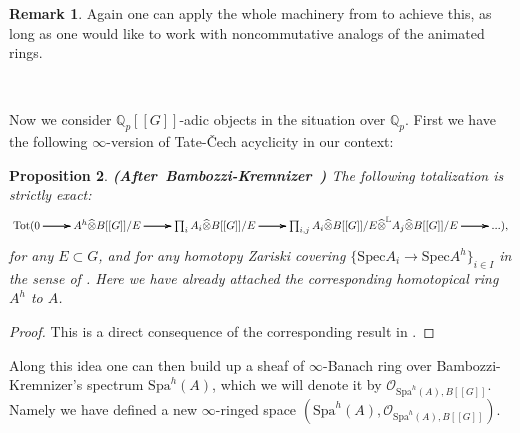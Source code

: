 \documentclass[12pt]{amsart}
\newtheorem{theorem}{Theorem}[section]
\newtheorem{proposition}[theorem]{Proposition}
\theoremstyle{definition}
\newtheorem{remark}[theorem]{Remark}
\numberwithin{equation}{section}
\begin{document}
\begin{remark}
Again one can apply the whole machinery from \cite{CS} to achieve this, as long as one would like to work with noncommutative analogs of the animated rings.	
\end{remark}






%


\

\indent Now we consider $\mathbb{Q}_p[[G]]$-adic objects in the situation over $\mathbb{Q}_p$. First we have the following $\infty$-version of Tate-\v{C}ech acyclicity in our context:


\begin{proposition}\mbox{\bf{(After Bambozzi-Kremnizer \cite[Theorem 4.15]{BK1})}} 
The following totalization is strictly exact:
\[
\xymatrix@C+0pc@R+0pc{
\mathrm{Tot}(0  \ar[r]\ar[r]\ar[r] &A^h\widehat{\otimes} B[[G]]/E \ar[r]\ar[r]\ar[r] & \prod_i A_i\widehat{\otimes} B[[G]]/E \ar[r]\ar[r]\ar[r] &\prod_{i,j} A_i\widehat{\otimes} B[[G]]/E \widehat{\otimes} ^\mathbb{L} A_j\widehat{\otimes}B[[G]]/E \ar[r]\ar[r]\ar[r] &...),
}
\]
for any $E\subset G$, and for any homotopy Zariski covering $\{\mathrm{Spec}A_i\rightarrow \mathrm{Spec}A^h\}_{i\in I}$ in the sense of \cite[Theorem 2.15, Theorem 4.15]{BK1}. Here we have already attached the corresponding homotopical ring $A^h$ to $A$.
\end{proposition}


\begin{proof}
This is a direct consequence of the corresponding result in \cite[Theorem 4.15]{BK1}.	
\end{proof}

\indent Along this idea one can then build up a sheaf of $\infty$-Banach ring over Bambozzi-Kremnizer's spectrum $\mathrm{Spa}^h(A)$, which we will denote it by $\mathcal{O}_{\mathrm{Spa}^h(A),B[[G]]}$. Namely we have defined a new $\infty$-ringed space $(\mathrm{Spa}^h(A),\mathcal{O}_{\mathrm{Spa}^h(A),B[[G]]})$.
\end{document}
